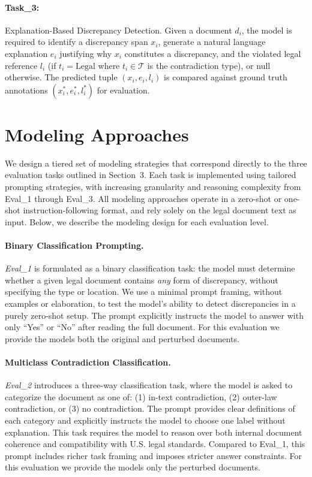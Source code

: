 \documentclass[11pt]{article}
\begin{document}
\paragraph{Task\_3:}

Explanation-Based Discrepancy Detection. Given a document $d_i$, the model is required to identify a discrepancy span $x_i$, generate a natural language explanation $e_i$ justifying why $x_i$ constitutes a discrepancy, and the violated legal reference $l_i$ (if $t_i = \text{Legal}$ where $t_i \in \mathcal{T}$ is the contradiction type), or null otherwise. The predicted tuple $(x_i, e_i, l_i)$ is compared against ground truth annotations $(x_i^{*}, e_i^{*}, l_i^{*})$ for evaluation. 

\section{Modeling Approaches}

We design a tiered set of modeling strategies that correspond directly to the three evaluation tasks outlined in Section~3. Each task is implemented using tailored prompting strategies, with increasing granularity and reasoning complexity from Eval\_1 through Eval\_3. All modeling approaches operate in a zero-shot or one-shot instruction-following format, and rely solely on the legal document text as input. Below, we describe the modeling design for each evaluation level.

\paragraph{Binary Classification Prompting.}

 \textit{Eval\_1} is formulated as a binary classification task: the model must determine whether a given legal document contains \textit{any} form of discrepancy, without specifying the type or location. We use a minimal prompt framing, without examples or elaboration, to test the model’s ability to detect discrepancies in a purely zero-shot setup. The prompt explicitly instructs the model to answer with only ``Yes'' or ``No'' after reading the full document. For this evaluation we provide the models both the original and perturbed documents. 

\paragraph{Multiclass Contradiction Classification.}

\textit{Eval\_2} introduces a three-way classification task, where the model is asked to categorize the document as one of: (1) in-text contradiction, (2) outer-law contradiction, or (3) no contradiction. The prompt provides clear definitions of each category and explicitly instructs the model to choose one label without explanation. This task requires the model to reason over both internal document coherence and compatibility with U.S. legal standards. Compared to Eval\_1, this prompt includes richer task framing and imposes stricter answer constraints. For this evaluation we provide the models only the perturbed documents.
\end{document}
